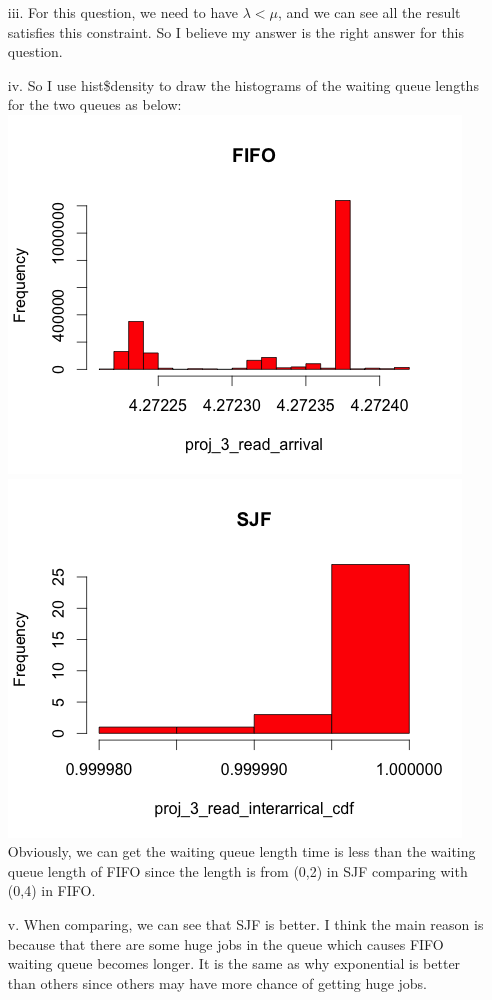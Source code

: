 \documentclass[11pt]{article}
\begin{document}
\begin{enumerate}
\begin{table}[htdp]
\begin{center}
\begin{tabular}{c|c|c|c|c}
\end{tabular}
\end{center}
\label{default}
\end{table}%
\item[iii.]
For this question, we need to have $\lambda < \mu$, and we can see all the result satisfies this constraint. So I believe my answer is the right answer for this question.
\item[iv.]
So I use hist\$density to draw the histograms of the waiting queue lengths for the two queues as below: \\
\includegraphics[scale=0.5]{FIFO_writing.png}
\includegraphics[scale=0.5]{SJF_waiting.png} \\
Obviously, we can get the waiting queue length time is less than the waiting queue length of FIFO since the length is from (0,2) in SJF comparing with (0,4) in FIFO.

\item[v.]
When comparing, we can see that SJF is better. I think the main reason is because that there are some huge jobs in the queue which causes FIFO waiting queue becomes longer. It is the same as why exponential is better than others since others may have more chance of getting huge jobs.
\end{enumerate}
\end{document}
